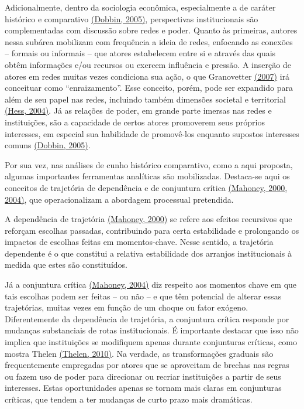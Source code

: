 Adicionalmente, dentro da sociologia econômica, especialmente a de
caráter histórico e comparativo
\href{https://www.zotero.org/google-docs/?Mnc7j7}{(Dobbin, 2005)},
perspectivas institucionais são complementadas com discussão sobre redes
e poder. Quanto às primeiras, autores nessa subárea mobilizam com
frequência a ideia de redes, enfocando as conexões -- formais ou
informais -- que atores estabelecem entre si e através das quais obtêm
informações e/ou recursos ou exercem influência e pressão. A inserção de
atores em redes muitas vezes condiciona sua ação, o que Granovetter
\href{https://www.zotero.org/google-docs/?CG4uYo}{(2007)} irá conceituar
como ``enraizamento''. Esse conceito, porém, pode ser expandido para
além de seu papel nas redes, incluindo também dimensões societal e
territorial \href{https://www.zotero.org/google-docs/?syvXQo}{(Hess,
2004)}. Já as relações de poder, em grande parte imersas nas redes e
instituições, são a capacidade de certos atores promoverem seus próprios
interesses, em especial sua habilidade de promovê-los enquanto supostos
interesses comuns
\href{https://www.zotero.org/google-docs/?j9POT7}{(Dobbin, 2005)}.

Por sua vez, nas análises de cunho histórico comparativo, como a aqui
proposta, algumas importantes ferramentas analíticas são mobilizadas.
Destaca-se aqui os conceitos de trajetória de dependência e de
conjuntura crítica
\href{https://www.zotero.org/google-docs/?cnzUw0}{(Mahoney, 2000,
2004)}, que operacionalizam a abordagem processual pretendida.

A dependência de trajetória
\href{https://www.zotero.org/google-docs/?iwUinW}{(Mahoney, 2000)} se
refere aos efeitos recursivos que reforçam escolhas passadas,
contribuindo para certa estabilidade e prolongando os impactos de
escolhas feitas em momentos-chave. Nesse sentido, a trajetória
dependente é o que constitui a relativa estabilidade dos arranjos
institucionais à medida que estes são constituídos.

Já a conjuntura crítica
\href{https://www.zotero.org/google-docs/?Tg9wjS}{(Mahoney, 2004)} diz
respeito aos momentos chave em que tais escolhas podem ser feitas -- ou
não -- e que têm potencial de alterar essas trajetórias, muitas vezes em
função de um choque ou fator exógeno. Diferentemente da dependência de
trajetória, a conjuntura crítica responde por mudanças substanciais de
rotas institucionais. É importante destacar que isso não implica que
instituições se modifiquem apenas durante conjunturas críticas, como
mostra Thelen \href{https://www.zotero.org/google-docs/?fJR3cT}{(Thelen,
2010)}. Na verdade, as transformações graduais são frequentemente
empregadas por atores que se aproveitam de brechas nas regras ou fazem
uso de poder para direcionar ou recriar instituições a partir de seus
interesses. Estas oportunidades apenas se tornam mais claras em
conjunturas críticas, que tendem a ter mudanças de curto prazo mais
dramáticas.

